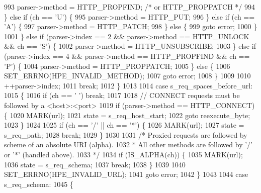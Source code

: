 \begin{DoxyCode}
993             parser->method = HTTP_PROPFIND; \textcolor{comment}{/* or HTTP\_PROPPATCH */}
994           \} \textcolor{keywordflow}{else} \textcolor{keywordflow}{if} (ch == \textcolor{charliteral}{'U'}) \{
995             parser->method = HTTP_PUT;
996           \} \textcolor{keywordflow}{else} \textcolor{keywordflow}{if} (ch == \textcolor{charliteral}{'A'}) \{
997             parser->method = HTTP_PATCH;
998           \} \textcolor{keywordflow}{else} \{
999             \textcolor{keywordflow}{goto} error;
1000           \}
1001         \} \textcolor{keywordflow}{else} \textcolor{keywordflow}{if} (parser->index == 2 && parser->method == HTTP_UNLOCK && ch == \textcolor{charliteral}{'S'}) \{
1002           parser->method = HTTP_UNSUBSCRIBE;
1003         \} \textcolor{keywordflow}{else} \textcolor{keywordflow}{if} (parser->index == 4 && parser->method == HTTP_PROPFIND && ch == \textcolor{charliteral}{'P'}) \{
1004           parser->method = HTTP_PROPPATCH;
1005         \} \textcolor{keywordflow}{else} \{
1006           SET_ERRNO(HPE_INVALID_METHOD);
1007           \textcolor{keywordflow}{goto} error;
1008         \}
1009 
1010         ++parser->index;
1011         \textcolor{keywordflow}{break};
1012       \}
1013 
1014       \textcolor{keywordflow}{case} s_req_spaces_before_url:
1015       \{
1016         \textcolor{keywordflow}{if} (ch == \textcolor{charliteral}{' '}) \textcolor{keywordflow}{break};
1017 
1018         \textcolor{comment}{// CONNECT requests must be followed by a <host>:<port>}
1019         \textcolor{keywordflow}{if} (parser->method == HTTP_CONNECT) \{
1020           MARK(url);
1021           state = s_req_host_start;
1022           \textcolor{keywordflow}{goto} reexecute\_byte;
1023         \}
1024 
1025         \textcolor{keywordflow}{if} (ch == \textcolor{charliteral}{'/'} || ch == \textcolor{charliteral}{'*'}) \{
1026           MARK(url);
1027           state = s_req_path;
1028           \textcolor{keywordflow}{break};
1029         \}
1030 
1031         \textcolor{comment}{/* Proxied requests are followed by scheme of an absolute URI (alpha).}
1032 \textcolor{comment}{         * All other methods are followed by '/' or '*' (handled above).}
1033 \textcolor{comment}{         */}
1034         \textcolor{keywordflow}{if} (IS_ALPHA(ch)) \{
1035           MARK(url);
1036           state = s_req_schema;
1037           \textcolor{keywordflow}{break};
1038         \}
1039 
1040         SET_ERRNO(HPE_INVALID_URL);
1041         \textcolor{keywordflow}{goto} error;
1042       \}
1043 
1044       \textcolor{keywordflow}{case} s_req_schema:
1045       \{

\end{DoxyCode}
